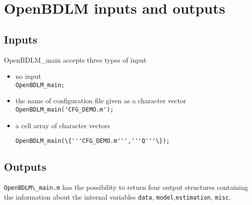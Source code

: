 \section{OpenBDLM inputs and outputs}
\label{S:OpenBDLMINPUTOUTPUT}

\subsection{Inputs}
\label{SS:OpenBDLMinput}
OpenBDLM\_main accepts three types of input
\begin{itemize}
  \item no input \\ 
  
  \colorbox{light-gray}{\lstinline[basicstyle = \mlttfamily \small]!OpenBDLM_main;!} \\  
  \item the name of configuration file given as a character vector\\ 
  
    \colorbox{light-gray}{\lstinline[basicstyle = \mlttfamily \small]!OpenBDLM_main('CFG_DEMO.m');!} \\ 
      
  \item a cell array of character vectors\\
  
\raggedright{\colorbox{light-gray}{\lstinline[basicstyle = \mlttfamily \small]!OpenBDLM_main(\{'''CFG_DEMO.m''','''Q'''\});!}} \\
\end{itemize}

\subsection{Outputs}

 \colorbox{light-gray}{\lstinline[basicstyle = \mlttfamily \small]!OpenBDLM\_main.m!} has the possibility to return four output \MATLAB{} structures containing the information about the internal variables \lstinline[basicstyle = \mlttfamily \small ]!data!, \lstinline[basicstyle = \mlttfamily \small ]!model!,\lstinline[basicstyle = \mlttfamily \small ]!estimation!, \lstinline[basicstyle = \mlttfamily \small ]!misc!.\\
 
